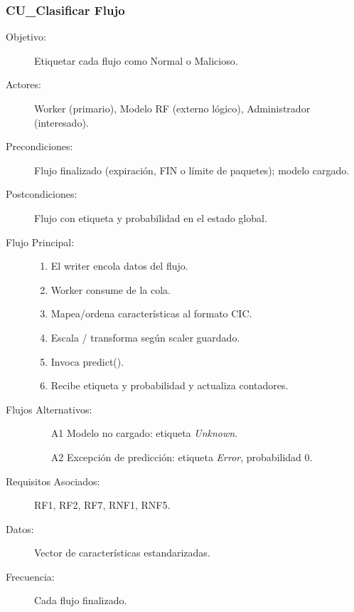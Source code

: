 \subsubsection{CU\_Clasificar Flujo}
\begin{description}
  \item[Objetivo:] Etiquetar cada flujo como Normal o Malicioso.
  \item[Actores:] Worker (primario), Modelo RF (externo lógico), Administrador (interesado).
  \item[Precondiciones:] Flujo finalizado (expiración, FIN o límite de paquetes); modelo cargado.
  \item[Postcondiciones:] Flujo con etiqueta y probabilidad en el estado global.
  \item[Flujo Principal:]
    \begin{enumerate}
      \item El writer encola datos del flujo.
      \item Worker consume de la cola.
      \item Mapea/ordena características al formato CIC.
      \item Escala / transforma según scaler guardado.
      \item Invoca predict().
      \item Recibe etiqueta y probabilidad y actualiza contadores.
    \end{enumerate}
  \item[Flujos Alternativos:]
    \begin{enumerate}
      \item[A1] Modelo no cargado: etiqueta \emph{Unknown}.
      \item[A2] Excepción de predicción: etiqueta \emph{Error}, probabilidad 0.
    \end{enumerate}
  \item[Requisitos Asociados:] RF1, RF2, RF7, RNF1, RNF5.
  \item[Datos:] Vector de características estandarizadas.
  \item[Frecuencia:] Cada flujo finalizado.
\end{description}

